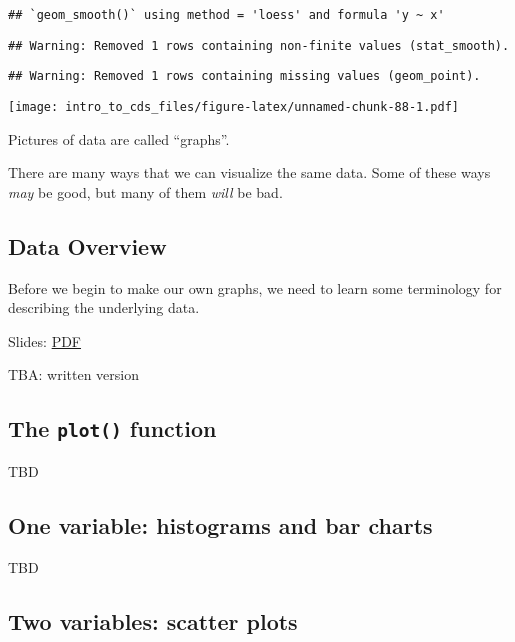 \documentclass[
]{article}
\theoremstyle{definition}
\theoremstyle{definition}
\theoremstyle{definition}
\theoremstyle{definition}
\theoremstyle{remark}
\begin{document}
\begin{verbatim}
## `geom_smooth()` using method = 'loess' and formula 'y ~ x'
\end{verbatim}

\begin{verbatim}
## Warning: Removed 1 rows containing non-finite values (stat_smooth).
\end{verbatim}

\begin{verbatim}
## Warning: Removed 1 rows containing missing values (geom_point).
\end{verbatim}

\texttt{[image: intro\_to\_cds\_files/figure-latex/unnamed-chunk-88-1.pdf]}

Pictures of data are called ``graphs''.

There are many ways that we can visualize the same data. Some of these ways \emph{may} be good, but many of them \emph{will} be bad.

\hypertarget{data-overview}{%
\subsection{Data Overview}\label{data-overview}}

Before we begin to make our own graphs, we need to learn some terminology for describing the underlying data.

Slides: \href{https://gmuedu-my.sharepoint.com/:b:/g/personal/dwhite34_gmu_edu/ETqhI64qDaFGja02KJaA_usBe0iEVyOhjM5kH7ENZswmsg?e=mg4B0G}{PDF}

TBA: written version

\hypertarget{the-plot-function}{%
\subsection{\texorpdfstring{The \texttt{plot()} function}{The plot() function}}\label{the-plot-function}}

TBD

\hypertarget{one-variable-histograms-and-bar-charts}{%
\subsection{One variable: histograms and bar charts}\label{one-variable-histograms-and-bar-charts}}

TBD

\hypertarget{two-variables-scatter-plots}{%
\subsection{Two variables: scatter plots}\label{two-variables-scatter-plots}}
\end{document}
